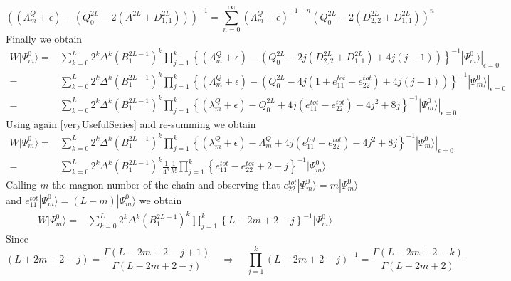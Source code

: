 \documentclass[10pt]{article}
\numberwithin{equation}{section}
\numberwithin{equation}{subsection}
\begin{document}
\begin{equation}
	\left((\Lambda_{m}^{Q}+\epsilon)-\left(Q_{0}^{2L}-2(A^{2L}+D_{1,1}^{2L})\right)\right)^{-1}=\sum_{n=0}^{\infty}(\Lambda_{m}^{Q}+\epsilon)^{-1-n}\left(Q_{0}^{2L}-2(D_{2,2}^{2L}+D_{1,1}^{2L})\right)^{n}
\end{equation}
Finally we obtain 
\begin{equation}\label{GoodBleft}
	\begin{split}
		W|\Psi_{m}^{0}\rangle=&\sum_{k=0}^{L}2^{k}\Delta^{k}(B_{1}^{2L-1})^{k}\prod_{j=1}^{k}\left\{(\Lambda_{m}^{Q}+\epsilon)-\left(Q_{0}^{2L}-2j(D_{2,2}^{2L}+D_{1,1}^{2L})+4j(j-1)\right)\right\}^{-1}|\Psi_{m}^{0}\rangle|_{\epsilon=0}
		\\=&
		\sum_{k=0}^{L}2^{k}\Delta^{k}(B_{1}^{2L-1})^{k}\prod_{j=1}^{k}\left\{(\Lambda_{m}^{Q}+\epsilon)-\left(Q_{0}^{2L}-4j(1+e_{11}^{tot}-e_{22}^{tot})+4j(j-1)\right)\right\}^{-1}|\Psi_{m}^{0}\rangle|_{\epsilon=0}
		\\=&
		\sum_{k=0}^{L}2^{k}\Delta^{k}(B_{1}^{2L-1})^{k}\prod_{j=1}^{k}\left\{(\lambda_{m}^{Q}+\epsilon)-Q_{0}^{2L}+4j(e_{11}^{tot}-e_{22}^{tot})-4j^{2}+8j\right\}^{-1}|\Psi_{m}^{0}\rangle|_{\epsilon=0}
	\end{split}
\end{equation}
Using again \eqref{veryUsefulSeries} and re-summing we obtain 
\begin{equation}
	\begin{split}
		W|\Psi_{m}^{0}\rangle=&	\sum_{k=0}^{L}2^{k}\Delta^{k}(B_{1}^{2L-1})^{k}\prod_{j=1}^{k}\left\{(\lambda_{m}^{Q}+\epsilon)-\Lambda_{m}^{Q}+4j(e_{11}^{tot}-e_{22}^{tot})-4j^{2}+8j\right\}^{-1}|\Psi_{m}^{0}\rangle|_{\epsilon=0}
		\\=&
		\sum_{k=0}^{L}2^{k}\Delta^{k}(B_{1}^{2L-1})^{k}\frac{1}{4^{k}}\frac{1}{k!}\prod_{j=1}^{k}\left\{e_{11}^{tot}-e_{22}^{tot}+2-j\right\}^{-1}|\Psi_{m}^{0}\rangle
	\end{split}
\end{equation}
Calling $m$ the magnon number of the chain and observing that $e_{22}^{tot}|\Psi_{m}^{0}\rangle=m|\Psi_{m}^{0}\rangle$ and $e_{11}^{tot}|\Psi_{m}^{0}\rangle=(L-m)|\Psi_{m}^{0}\rangle$ we obtain 
\begin{equation}
	\begin{split}
		W|\Psi_{m}^{0}\rangle=&	\sum_{k=0}^{L}2^{k}\Delta^{k}(B_{1}^{2L-1})^{k}\prod_{j=1}^{k}\left\{L-2m+2-j\right\}^{-1}|\Psi_{m}^{0}\rangle
	\end{split}
\end{equation}
Since 
\begin{equation}
	(L+2m+2-j)=\frac{\Gamma(L-2m+2-j+1)}{\Gamma(L-2m+2-j)}\quad \Rightarrow\quad \prod_{j=1}^{k}(L-2m+2-j)^{-1}=\frac{\Gamma(L-2m+2-k)}{\Gamma(L-2m+2)}
\end{equation}
\end{document}
